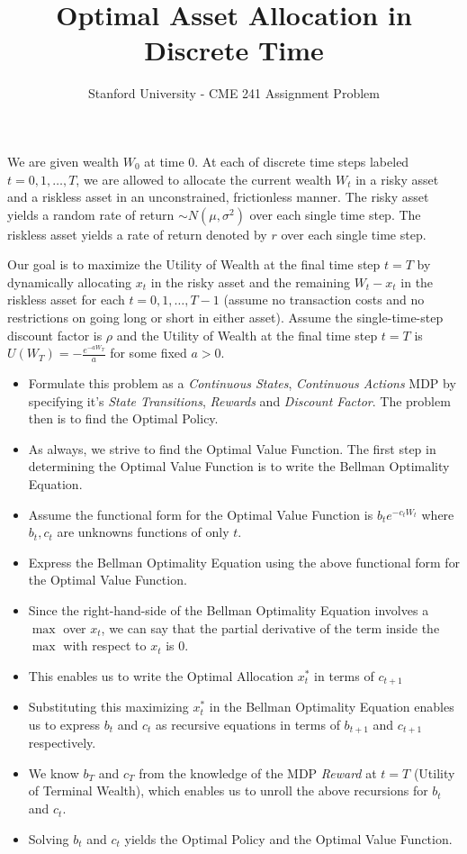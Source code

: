 \documentclass[12pt]{amsart}
\title{Optimal Asset Allocation in Discrete Time}
\author{Stanford University - CME 241 Assignment Problem}
\date{} %
\begin{document}
\maketitle

We are given wealth $W_0$ at time 0. At each of discrete time steps labeled $t = 0, 1, \ldots, T$, we are allowed to allocate the current wealth $W_t$ in a risky asset and a riskless asset in an unconstrained, frictionless manner. The risky asset yields a random rate of return $\sim N(\mu, \sigma^2)$ over each single time step. The riskless asset yields a rate of return denoted by $r$ over each single time step.

Our goal is to maximize the Utility of Wealth at the final time step $t=T$ by dynamically allocating $x_t$ in the risky asset and the remaining $W_t - x_t$ in the riskless asset for each $t = 0, 1, \ldots, T-1$ (assume no transaction costs and no restrictions on going long or short in either asset). Assume the single-time-step discount factor is $\rho$ and the Utility of Wealth at the final time step $t=T$ is $U(W_T) = - \frac {e^{-a W_T}} {a}$ for some fixed $a > 0$.

\begin{itemize}
\item Formulate this problem as a {\em Continuous States}, {\em Continuous Actions} MDP by specifying it's {\em State Transitions}, {\em Rewards} and {\em Discount Factor}. The problem then is to find the Optimal Policy.
\item As always, we strive to find the Optimal Value Function. The first step in determining the Optimal Value Function is to write the Bellman Optimality Equation.
\item Assume the functional form for the Optimal Value Function is $b_t e^{-c_t W_t}$ where $b_t, c_t$ are unknowns functions of only $t$.
\item Express the Bellman Optimality Equation using the above functional form for the Optimal Value Function.
\item Since the right-hand-side of the Bellman Optimality Equation involves a $\max$ over $x_t$, we can say that the partial derivative of the term inside the $\max$ with respect to $x_t$ is 0.
\item This enables us to write the Optimal Allocation $x_t^*$ in terms of $c_{t+1}$
\item Substituting this maximizing $x_t^*$ in the Bellman Optimality Equation enables us to express $b_t$ and $c_t$ as recursive equations in terms of $b_{t+1}$ and $c_{t+1}$ respectively.
\item We know $b_T$ and $c_T$ from the knowledge of the MDP {\em Reward} at $t=T$ (Utility of Terminal Wealth), which enables us to unroll the above recursions for $b_t$ and $c_t$.
\item Solving $b_t$ and $c_t$ yields the Optimal Policy and the Optimal Value Function.
\end{itemize}
\end{document}
